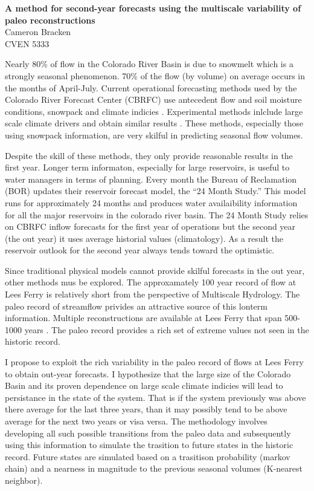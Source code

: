 \documentclass[11pt]{article}
\begin{document}
{\large\bf A method for second-year forecasts using the multiscale variability of paleo reconstructions}\\
Cameron Bracken\\
CVEN 5333

Nearly 80\% of flow in the Colorado River Basin is due to snowmelt which is a strongly seasonal phenomenon.  70\% of the flow (by volume) on average occurs in the months of April-July.  Current operational forecasting methods used by the Colorado River Forecast Center (CBRFC) use antecedent flow and soil moisture conditions, snowpack and climate indicies \citep{Brandon2005}.  Experimental methods inlclude large scale climate drivers and obtain similar results \citep{Bracken:2010p2682, Regonda2006, Grantz2005}.  These methods, especially those using snowpack information, are very skilful in predicting seasonal flow volumes.  

Despite the skill of these methods, they only provide reasonable results in the first year.  Longer term informaton, especially for large reservoirs, is useful to water managers in terms of planning. Every month the Bureau of Reclamation (BOR) updates their reservoir forecast model, the ``24 Month Study.''  This model runs for approximately 24 months and produces water availaibility information for all the major reservoirs in the colorado river basin.  The 24 Month Study relies on CBRFC inflow forecasts for the first year of operations but the second year (the out year) it uses average historial values (climatology).  As a result the reservoir outlook for the second year always tends toward the optimistic. 

Since traditional physical models cannot provide skilful forecasts in the out year, other methods mus be explored.  The approxamately 100 year record of flow at Lees Ferry is relatively short from the perspective of Multiscale Hydrology.  The paleo record of streamflow privides an attractive source of this lonterm information.  Multiple reconstructions are available at Lees Ferry that span 500-1000 years \cite{Woodhouse:2006p1287, Gangopadhyay:2009p61}.  The paleo record provides a rich set of extreme values not seen in the historic record. 

I propose to exploit the rich variability in the paleo record of flows at Lees Ferry to obtain out-year forecasts.  I hypothesize that the large size of the Colorado Basin and its proven dependence on large scale climate indicies will lead to persistance in the state of the system. That is if the system previously was above there average for the last three years, than it may possibly tend to be  above average for the next two years or visa versa.  The methodology involves developing all such possible transitions from the paleo data and subsequently using this information to simulate the trasition to future states in the historic record.  Future states are simulated based on a trasitison probability (markov chain) and a nearness in magnitude to the previous seasonal volumes (K-nearest neighbor).  


\end{document}
